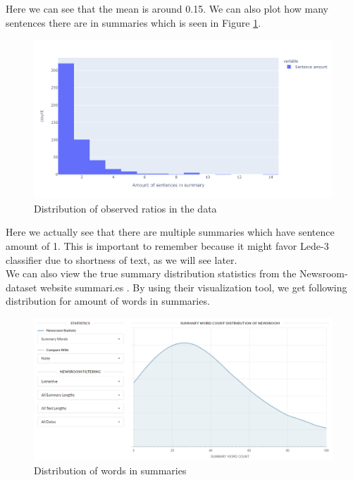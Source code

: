 \documentclass{article}
\begin{document}
\noindent
Here we can see that the mean is around 0.15. We can also plot how many sentences there are in summaries which is seen in Figure \ref{fig:empirical_lengths}.

\noindent
\begin{figure}[H]
	\centering
	\hspace*{-3cm}
	\includegraphics[scale=0.55]{empirical_lengths.png}
	\caption{Distribution of observed ratios in the data}
	\label{fig:empirical_lengths}
\end{figure}

\noindent
Here we actually see that there are multiple summaries which have sentence amount of 1. This is important to remember because it might favor Lede-3 classifier due to shortness of text, as we will see later.\\

\noindent
We can also view the true summary distribution statistics from the Newsroom-dataset website summari.es \cite{dataset}. By using their visualization tool, we get following distribution for amount of words in summaries. \\

\noindent
\begin{figure}[H]
	\centering
	\hspace*{-3cm}
	\includegraphics[scale=0.55]{words_in_summary.png}
	\caption{Distribution of words in summaries}
	\label{fig:words_in_summary}
\end{figure}
\end{document}
